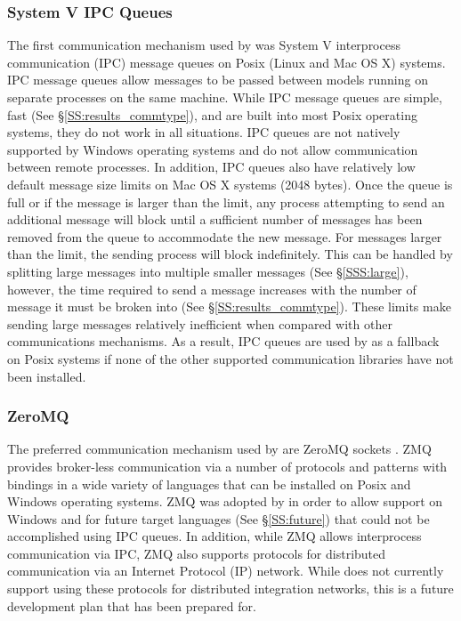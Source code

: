 \documentclass[journal]{IEEEtran}
\newcommand{\todo}[1]{{\color{red}{#1}}}
\newcommand{\pkg}{{\tt \todo{cis\_interface}}{}}
\begin{document}
\subsubsection{System V IPC Queues}\label{SSS:ipc}
%
The first communication mechanism used by {\pkg} was System V interprocess 
communication (IPC) message queues \citep{Rusling1999} on Posix (Linux and Mac OS X) systems. 
IPC message queues allow messages to be passed between models running on separate 
processes on the same machine. While IPC message queues are simple, fast 
(See \S\ref{SS:results_commtype}), and are built into most Posix operating systems, they do not work in all 
situations. IPC queues are not natively supported by Windows operating systems 
and do not allow communication between remote processes. In addition, IPC queues also 
have relatively low default message size limits on Mac OS X systems (2048 bytes). Once 
the queue is full or if the message is larger than the limit, any process attempting to send an additional message will block until a 
sufficient number of messages has been removed from the queue to accommodate the new message. 
For messages larger than the limit, the sending process will block indefinitely. 
This can be handled by splitting large messages into multiple smaller messages 
(See \S\ref{SSS:large}), however, the time required to send a message increases with the number of 
message it must be broken into (See \S\ref{SS:results_commtype}). These limits make sending large messages 
relatively inefficient when compared with other communications mechanisms. 
As a result, IPC queues are used by 
{\pkg} as a fallback on Posix systems if none of the other supported communication libraries have 
not been installed.

\subsubsection{ZeroMQ}\label{SSS:zmq}
%
The preferred communication mechanism used by {\pkg} are ZeroMQ sockets 
\citep[ZMQ][]{Akgul2013}. ZMQ 
provides broker-less communication via a number of protocols and patterns with 
bindings in a wide variety of languages that can be installed on Posix and Windows 
operating systems. ZMQ was adopted by {\pkg} in order to allow support 
on Windows and for future target languages (See \S\ref{SS:future}) that could not be 
accomplished using IPC queues. In addition, while ZMQ allows 
interprocess communication via IPC, ZMQ also 
supports protocols for distributed communication via an Internet Protocol (IP) 
network. While {\pkg} does not currently support using these protocols 
for distributed integration networks, this is a future development plan that has been prepared for.
\end{document}
